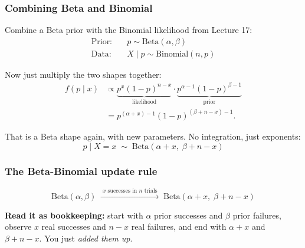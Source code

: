 \documentclass[slidestop,compress,mathserif]{beamer}
\begin{document}
\begin{frame}
\frametitle{Combining Beta and Binomial}

Combine a Beta prior with the Binomial likelihood from Lecture 17:
\vspace{-0.6em}
\begin{align*}
\text{Prior:} \quad & p \sim \text{Beta}(\alpha, \beta) \\
\text{Data:} \quad & X \mid p \sim \text{Binomial}(n, p)
\end{align*}
\pause
\vspace{-0.8em}

Now just multiply the two shapes together:
\vspace{-0.6em}
\begin{align*}
f(p \mid x) &\propto \underbrace{p^x(1-p)^{n-x}}_{\text{likelihood}} \cdot \underbrace{p^{\alpha-1}(1-p)^{\beta-1}}_{\text{prior}} \\[-0.2em]
&= p^{(\alpha + x) - 1}(1-p)^{(\beta + n - x) - 1}.
\end{align*}
\pause
\vspace{-0.3em}

That is a Beta shape again, with new parameters. No integration, just exponents:
\vspace{-0.6em}
\[
p \mid X = x \;\sim\; \text{Beta}(\alpha + x,\; \beta + n - x)
\]

\end{frame}

\begin{frame}
\frametitle{The Beta-Binomial update rule}

\[
\text{Beta}(\alpha, \beta) \;\xrightarrow{\;x \text{ successes in } n \text{ trials}\;}\; \text{Beta}(\alpha + x,\; \beta + n - x)
\]
\pause
\medskip

\textbf{Read it as bookkeeping:} start with $\alpha$ prior successes and $\beta$ prior failures, observe $x$ real successes and $n-x$ real failures, and end with $\alpha + x$ and $\beta + n - x$. You just \emph{added them up}.

\pause
\medskip


\end{frame}
\end{document}
